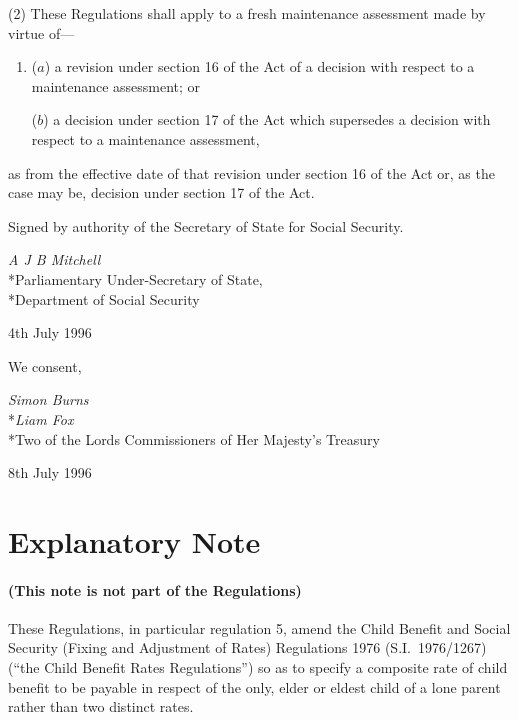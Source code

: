 \documentclass[12pt,a4paper]{article}
\begin{document}
(2) These Regulations shall apply to a fresh maintenance assessment made by virtue of—
\begin{enumerate}\item[]
($a$) a revision under section 16 of the Act of a decision with respect to a maintenance assessment; or

($b$) a decision under section 17 of the Act which supersedes a decision with respect to a maintenance assessment,
\end{enumerate}
as from the effective date of that revision under section 16 of the Act or, as the case may be, decision under section 17 of the Act.


\bigskip

Signed by authority of the Secretary of State for Social Security.

{\raggedleft
\emph{A J B Mitchell}\\*Parliamentary Under-Secretary of State,\\*Department of Social Security

}

4th July 1996

\bigskip

We consent,

{\raggedleft
\emph{Simon Burns}\\*\emph{Liam Fox}\\*Two of the Lords Commissioners of Her Majesty’s Treasury

}

8th July 1996

\part{Explanatory Note}

\renewcommand\parthead{--- Explanatory Note}

\subsection*{(This note is not part of the Regulations)}

These Regulations, in particular regulation 5, amend the Child Benefit and Social Security (Fixing and Adjustment of Rates) Regulations 1976 (S.I.\ 1976/1267) (“the Child Benefit Rates Regulations”) so as to specify a composite rate of child benefit to be payable in respect of the only, elder or eldest child of a lone parent rather than two distinct rates.
\end{document}
